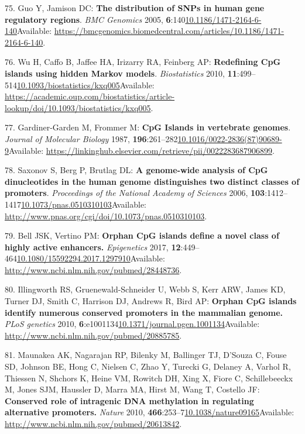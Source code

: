 \documentclass[
]{book}
\begin{document}
\leavevmode\hypertarget{ref-Guo2005}{}%
75. Guo Y, Jamison DC: \textbf{The distribution of SNPs in human gene regulatory regions}. \emph{BMC Genomics} 2005, \textbf{6}:140\href{https://doi.org/10.1186/1471-2164-6-140}{10.1186/1471-2164-6-140}Available: \url{https://bmcgenomics.biomedcentral.com/articles/10.1186/1471-2164-6-140}.

\leavevmode\hypertarget{ref-Wu2010}{}%
76. Wu H, Caffo B, Jaffee HA, Irizarry RA, Feinberg AP: \textbf{Redefining CpG islands using hidden Markov models}. \emph{Biostatistics} 2010, \textbf{11}:499--514\href{https://doi.org/10.1093/biostatistics/kxq005}{10.1093/biostatistics/kxq005}Available: \url{https://academic.oup.com/biostatistics/article-lookup/doi/10.1093/biostatistics/kxq005}.

\leavevmode\hypertarget{ref-Gardiner-Garden1987}{}%
77. Gardiner-Garden M, Frommer M: \textbf{CpG Islands in vertebrate genomes}. \emph{Journal of Molecular Biology} 1987, \textbf{196}:261--282\href{https://doi.org/10.1016/0022-2836(87)90689-9}{10.1016/0022-2836(87)90689-9}Available: \url{https://linkinghub.elsevier.com/retrieve/pii/0022283687906899}.

\leavevmode\hypertarget{ref-Saxonov2006}{}%
78. Saxonov S, Berg P, Brutlag DL: \textbf{A genome-wide analysis of CpG dinucleotides in the human genome distinguishes two distinct classes of promoters}. \emph{Proceedings of the National Academy of Sciences} 2006, \textbf{103}:1412--1417\href{https://doi.org/10.1073/pnas.0510310103}{10.1073/pnas.0510310103}Available: \url{http://www.pnas.org/cgi/doi/10.1073/pnas.0510310103}.

\leavevmode\hypertarget{ref-Bell2017}{}%
79. Bell JSK, Vertino PM: \textbf{Orphan CpG islands define a novel class of highly active enhancers.} \emph{Epigenetics} 2017, \textbf{12}:449--464\href{https://doi.org/10.1080/15592294.2017.1297910}{10.1080/15592294.2017.1297910}Available: \url{http://www.ncbi.nlm.nih.gov/pubmed/28448736}.

\leavevmode\hypertarget{ref-Illingworth2010}{}%
80. Illingworth RS, Gruenewald-Schneider U, Webb S, Kerr ARW, James KD, Turner DJ, Smith C, Harrison DJ, Andrews R, Bird AP: \textbf{Orphan CpG islands identify numerous conserved promoters in the mammalian genome.} \emph{PLoS genetics} 2010, \textbf{6}:e1001134\href{https://doi.org/10.1371/journal.pgen.1001134}{10.1371/journal.pgen.1001134}Available: \url{http://www.ncbi.nlm.nih.gov/pubmed/20885785}.

\leavevmode\hypertarget{ref-Maunakea2010}{}%
81. Maunakea AK, Nagarajan RP, Bilenky M, Ballinger TJ, D'Souza C, Fouse SD, Johnson BE, Hong C, Nielsen C, Zhao Y, Turecki G, Delaney A, Varhol R, Thiessen N, Shchors K, Heine VM, Rowitch DH, Xing X, Fiore C, Schillebeeckx M, Jones SJM, Haussler D, Marra MA, Hirst M, Wang T, Costello JF: \textbf{Conserved role of intragenic DNA methylation in regulating alternative promoters.} \emph{Nature} 2010, \textbf{466}:253--7\href{https://doi.org/10.1038/nature09165}{10.1038/nature09165}Available: \url{http://www.ncbi.nlm.nih.gov/pubmed/20613842}.
\end{document}
